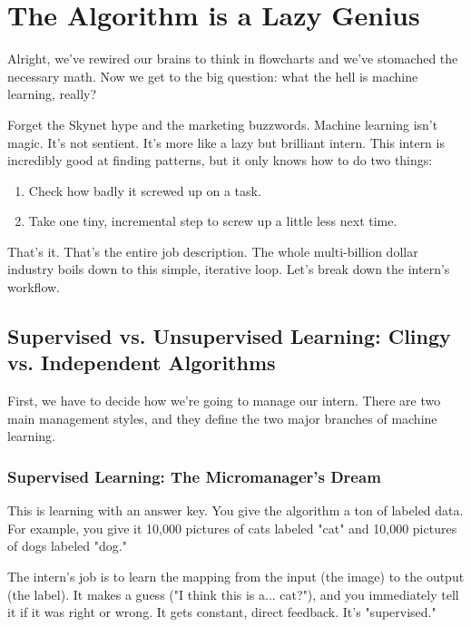 \documentclass[11pt, letterpaper, openany]{book}
\begin{document}
\chapter{The Algorithm is a Lazy Genius}

Alright, we've rewired our brains to think in flowcharts and we've stomached the necessary math. Now we get to the big question: what the hell is machine learning, really?

Forget the Skynet hype and the marketing buzzwords. Machine learning isn't magic. It's not sentient. It's more like a lazy but brilliant intern. This intern is incredibly good at finding patterns, but it only knows how to do two things:
\begin{enumerate}
    \item Check how badly it screwed up on a task.
    \item Take one tiny, incremental step to screw up a little less next time.
\end{enumerate}
That's it. That's the entire job description. The whole multi-billion dollar industry boils down to this simple, iterative loop. Let's break down the intern's workflow.

\section{Supervised vs. Unsupervised Learning: Clingy vs. Independent Algorithms}

First, we have to decide how we're going to manage our intern. There are two main management styles, and they define the two major branches of machine learning.

\subsection{Supervised Learning: The Micromanager's Dream}

This is learning with an answer key. You give the algorithm a ton of labeled data. For example, you give it 10,000 pictures of cats labeled "cat" and 10,000 pictures of dogs labeled "dog."

The intern's job is to learn the mapping from the input (the image) to the output (the label). It makes a guess ("I think this is a... cat?"), and you immediately tell it if it was right or wrong. It gets constant, direct feedback. It's "supervised."
\end{document}
